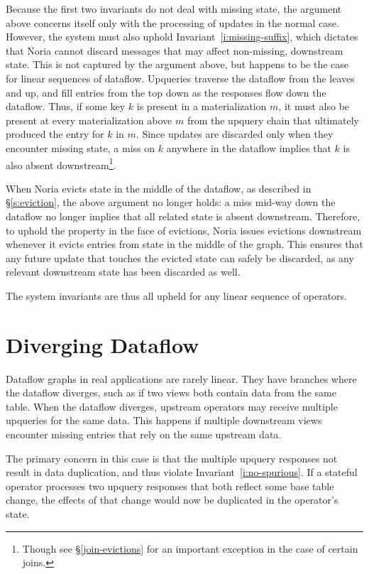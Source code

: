 Because the first two invariants do not deal with missing state, the argument
above concerns itself only with the processing of updates in the normal case.
However, the system must also uphold Invariant~\ref{i:missing-suffix}, which
dictates that Noria cannot discard messages that may affect non-missing,
downstream state. This is not captured by the argument above, but happens to be
the case for linear sequences of dataflow. Upqueries traverse the dataflow from
the leaves and up, and fill entries from the top down as the responses flow down
the dataflow. Thus, if some key $k$ is present in a materialization $m$, it must
also be present at every materialization above $m$ from the upquery chain that
ultimately produced the entry for $k$ in $m$. Since updates are discarded only
when they encounter missing state, a miss on $k$ anywhere in the dataflow
implies that $k$ is also absent downstream\footnote{Though see
\S\ref{join-evictions} for an important exception in the case of certain
joins.}.

When Noria evicts state in the middle of the dataflow, as described in
\S\ref{s:eviction}, the above argument no longer holds: a miss mid-way down the
dataflow no longer implies that all related state is absent downstream.
Therefore, to uphold the property in the face of evictions, Noria issues
evictions downstream whenever it evicts entries from state in the middle of the
graph. This ensures that any future update that touches the evicted state can
safely be discarded, as any relevant downstream state has been discarded as
well.

The system invariants are thus all upheld for any linear sequence of operators.

\section{Diverging Dataflow}
\label{s:partial:diverging}

Dataflow graphs in real applications are rarely linear. They have branches where
the dataflow diverges, such as if two views both contain data from the same
table. When the dataflow diverges, upstream operators may receive multiple
upqueries for the same data. This happens if multiple downstream views encounter
missing entries that rely on the same upstream data.

The primary concern in this case is that the multiple upquery responses not
result in data duplication, and thus violate Invariant~\ref{i:no-spurious}. If a
stateful operator processes two upquery responses that both reflect some base
table change, the effects of that change would now be duplicated in the
operator's state.


